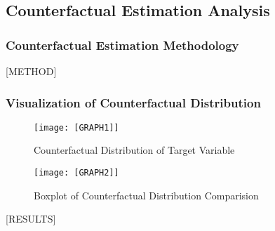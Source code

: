 \subsection{Counterfactual Estimation Analysis}

\subsubsection{Counterfactual Estimation Methodology}

[METHOD]

\subsubsection{Visualization of Counterfactual Distribution}

\begin{minipage}[t]{0.6\linewidth}
    \begin{figure}[H]
        \centering
        \texttt{[image: [GRAPH1]]}
        \caption{Counterfactual Distribution of Target Variable}
    \end{figure}
\vfill
\end{minipage}
\hfill
\begin{minipage}[t]{0.4\linewidth}
    \begin{figure}[H]
        \centering
        \texttt{[image: [GRAPH2]]}
        \caption{Boxplot of Counterfactual Distribution Comparision}
    \end{figure}
\end{minipage}

[RESULTS]
